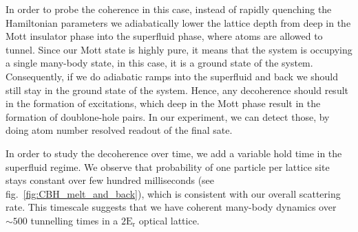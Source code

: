 In order to probe the coherence in this case, instead of rapidly quenching the Hamiltonian parameters we adiabatically lower the lattice depth from deep in the Mott insulator phase into the superfluid phase, where atoms are allowed to tunnel. Since our Mott state is highly pure, it means that the system is occupying a single many-body state, in this case, it is a ground state of the system. Consequently, if we do adiabatic ramps into the superfluid and back we should still stay in the ground state of the system. Hence, any decoherence should result in the formation of excitations, which deep in the Mott phase result in the formation of doublone-hole pairs. In our experiment, we can detect those, by doing atom number resolved readout of the final sate.

In order to study the decoherence over time, we add a variable hold time in the superfluid regime. We observe that probability of one particle per lattice site stays constant over few hundred milliseconds (see fig.~\ref{fig:CBH_melt_and_back}), which is consistent with our overall scattering rate. This timescale suggests that we have coherent many-body dynamics over $\sim 500$ tunnelling times in a $2\mathrm{E_r}$ optical lattice.